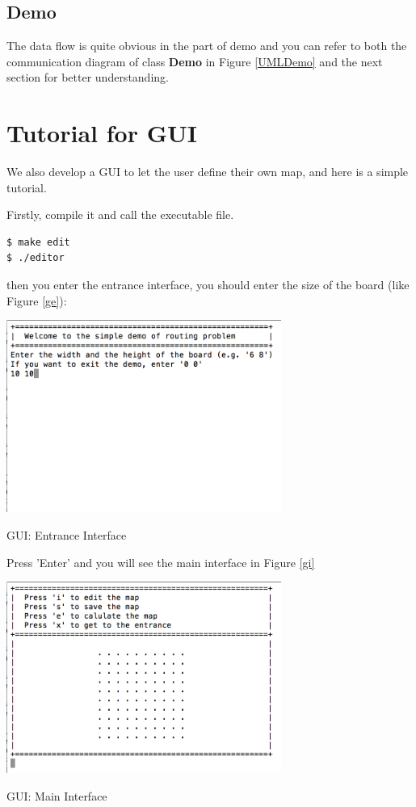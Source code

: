 \documentclass[twocolumn]{article}
\begin{document}
\subsection{Demo}

The data flow is quite obvious in the part of demo and you can refer to both the communication diagram of class \textbf{Demo} in Figure \ref{UMLDemo} and the next section for better understanding.

\section{Tutorial for GUI}

We also develop a GUI to let the user define their own map, and here is a simple tutorial.

Firstly, compile it and call the executable file.

\begin{lstlisting}
$ make edit
$ ./editor
\end{lstlisting}

then you enter the entrance interface, you should enter the size of the board (like Figure \ref{ge}):

\begin{center}
\makeatletter
\def\@captype{figure}
\makeatother
\includegraphics [width = 9cm]{GUI-entrance}
\caption{GUI: Entrance Interface}
\label{ge}
\end{center}

Press 'Enter' and you will see the main interface in Figure \ref{gi}

\begin{center}
\makeatletter
\def\@captype{figure}
\makeatother
\includegraphics [width = 9cm]{Gui-main}
\caption{GUI: Main Interface}
\label{gi}
\end{center}
\end{document}
